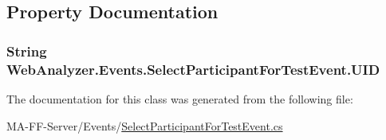 \subsection{Property Documentation}
\hypertarget{class_web_analyzer_1_1_events_1_1_select_participant_for_test_event_a1749346fd01c6ff1a5561aa99d797dcc}{}
\subsubsection[{U\+I\+D}]{\setlength{\rightskip}{0pt plus 5cm}String Web\+Analyzer.\+Events.\+Select\+Participant\+For\+Test\+Event.\+U\+I\+D\hspace{0.3cm}{\ttfamily [get]}}\label{class_web_analyzer_1_1_events_1_1_select_participant_for_test_event_a1749346fd01c6ff1a5561aa99d797dcc}


The documentation for this class was generated from the following file\+:\begin{DoxyCompactItemize}
\item 
M\+A-\/\+F\+F-\/\+Server/\+Events/\hyperlink{_select_participant_for_test_event_8cs}{Select\+Participant\+For\+Test\+Event.\+cs}\end{DoxyCompactItemize}
